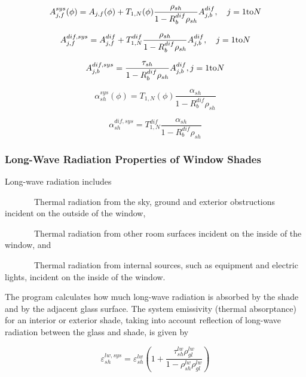 \begin{equation}
A_{j,f}^{sys}(\phi ) = {A_{j,f}}(\phi ) + {T_{1,N}}(\phi )\frac{{{\rho_{sh}}}}{{1 - R_b^{dif}{\rho_{sh}}}}A_{j,b}^{dif},\quad j = 1{\rm{ to }}N
\end{equation}

\begin{equation}
A_{j,f}^{dif,sys} = A_{j,f}^{dif} + T_{1,N}^{dif}\frac{{{\rho_{sh}}}}{{1 - R_b^{dif}{\rho_{sh}}}}A_{j,b}^{dif},\quad j = 1{\rm{ to }}N
\end{equation}

\begin{equation}
A_{j,b}^{dif,sys} = \frac{{{\tau_{sh}}}}{{1 - R_b^{dif}{\rho_{sh}}}}A_{j,b}^{dif},{\rm{    }}j = 1{\rm{ to }}N
\end{equation}

\begin{equation}
\alpha_{sh}^{sys}(\phi ) = T_{1,N}^{}(\phi )\frac{{{\alpha_{sh}}}}{{1 - R_b^{dif}{\rho_{sh}}}}
\end{equation}

\begin{equation}
\alpha_{sh}^{dif,sys} = T_{1,N}^{dif}\frac{{{\alpha_{sh}}}}{{1 - R_b^{dif}{\rho_{sh}}}}
\end{equation}

\subsubsection{Long-Wave Radiation Properties of Window Shades}\label{long-wave-radiation-properties-of-window-shades}

Long-wave radiation includes

~~~~~~~Thermal radiation from the sky, ground and exterior obstructions incident on the outside of the window,

~~~~~~~Thermal radiation from other room surfaces incident on the inside of the window, and

~~~~~~~Thermal radiation from internal sources, such as equipment and electric lights, incident on the inside of the window.

The program calculates how much long-wave radiation is absorbed by the shade and by the adjacent glass surface. The system emissivity (thermal absorptance) for an interior or exterior shade, taking into account reflection of long-wave radiation between the glass and shade, is given by

\begin{equation}
\varepsilon_{sh}^{lw,sys} = \varepsilon_{sh}^{lw}\left( {1 + \frac{{\tau_{sh}^{lw}\rho_{gl}^{lw}}}{{1 - \rho_{sh}^{lw}\rho_{gl}^{lw}}}} \right)
\end{equation}

